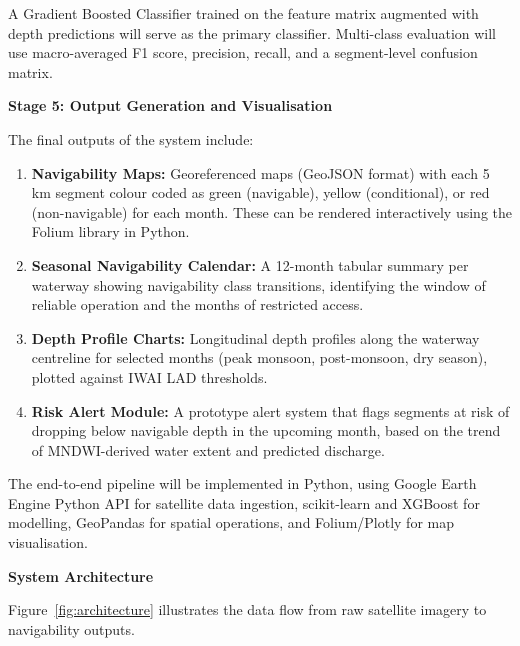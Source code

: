 \documentclass[12pt,a4paper]{article}
\begin{document}
A Gradient Boosted Classifier trained on the feature matrix augmented with depth predictions will serve as the primary classifier. Multi-class evaluation will use macro-averaged F1 score, precision, recall, and a segment-level confusion matrix.

\vspace{0.4cm}
\noindent\textbf{Stage 5: Output Generation and Visualisation}

The final outputs of the system include:

\begin{enumerate}[leftmargin=1.5cm]
\item \textbf{Navigability Maps:} Georeferenced maps (GeoJSON format) with each 5 km segment colour coded as green (navigable), yellow (conditional), or red (non-navigable) for each month. These can be rendered interactively using the Folium library in Python.
\item \textbf{Seasonal Navigability Calendar:} A 12-month tabular summary per waterway showing navigability class transitions, identifying the window of reliable operation and the months of restricted access.
\item \textbf{Depth Profile Charts:} Longitudinal depth profiles along the waterway centreline for selected months (peak monsoon, post-monsoon, dry season), plotted against IWAI LAD thresholds.
\item \textbf{Risk Alert Module:} A prototype alert system that flags segments at risk of dropping below navigable depth in the upcoming month, based on the trend of MNDWI-derived water extent and predicted discharge.
\end{enumerate}

The end-to-end pipeline will be implemented in Python, using Google Earth Engine Python API for satellite data ingestion, scikit-learn and XGBoost for modelling, GeoPandas for spatial operations, and Folium/Plotly for map visualisation.

\vspace{0.4cm}
\noindent\textbf{System Architecture}

Figure~\ref{fig:architecture} illustrates the data flow from raw satellite imagery to navigability outputs.
\end{document}
